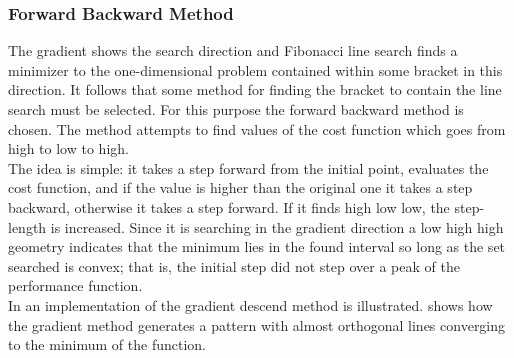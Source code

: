 \subsubsection{Forward Backward Method}
The gradient shows the search direction and Fibonacci line search finds a minimizer to the one-dimensional problem contained within some bracket in this direction. It follows that some method for finding the bracket to contain the line search must be selected. For this purpose the forward backward method is chosen. The method attempts to find values of the cost function which goes from high to low to high.\\
The idea is simple: it takes a step forward from the initial point, evaluates the cost function, and if the value is higher than the original one it takes a step backward, otherwise it takes a step forward. If it finds high low low, the step-length is increased. Since it is searching in the gradient direction a low high high geometry indicates that the minimum lies in the found interval so long as the set searched is convex; that is, the initial step did not step over a peak of the performance function.\\
In  an implementation of the gradient descend method is illustrated.  shows how the gradient method generates a pattern with almost orthogonal lines converging to the minimum of the function.

